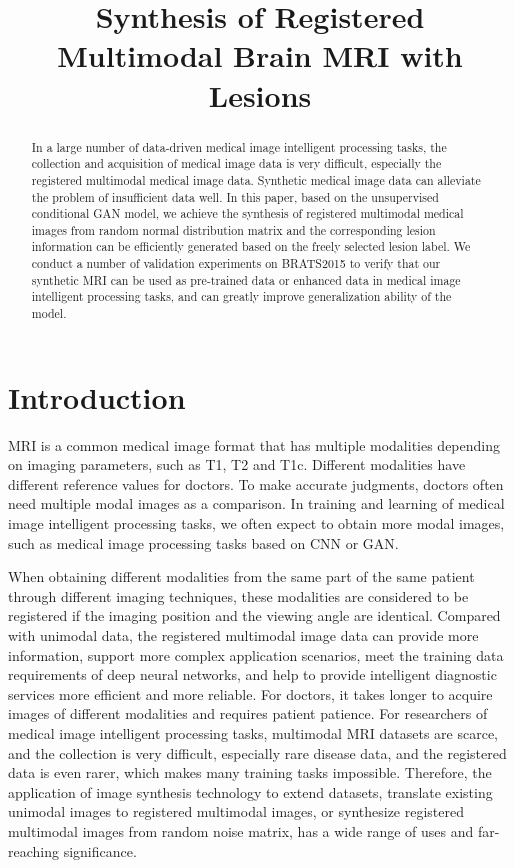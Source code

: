 \documentclass[letterpaper]{article} %
\title{Synthesis of Registered Multimodal Brain MRI with Lesions}
\begin{document}
\maketitle

\begin{abstract}
In a large number of data-driven medical image intelligent processing tasks, the collection and acquisition of medical image data is very difficult, especially the registered multimodal medical image data. Synthetic medical image data can alleviate the problem of insufficient data well. In this paper, based on the unsupervised conditional GAN model, we achieve the synthesis of registered multimodal medical images from random normal distribution matrix and the corresponding lesion information can be efficiently generated based on the freely selected lesion label. We conduct a number of validation experiments on BRATS2015 to verify that our synthetic MRI can be used as pre-trained data or enhanced data in medical image intelligent processing tasks, and can greatly improve generalization ability of the model.
\end{abstract}
	
\section{Introduction}
MRI is a common medical image format that has multiple modalities depending on imaging parameters, such as T1, T2 and T1c. Different modalities have different reference values for doctors. To make accurate judgments, doctors often need multiple modal images as a comparison. In training and learning of medical image intelligent processing tasks, we often expect to obtain more modal images, such as medical image processing tasks based on CNN\cite{86krizhevsky2012imagenet} or GAN\cite{25goodfellow2014generative}. 

When obtaining different modalities from the same part of the same patient through different imaging techniques, these modalities are considered to be registered if the imaging position and the viewing angle are identical. Compared with unimodal data, the registered multimodal image data can provide more information, support more complex application scenarios, meet the training data requirements of deep neural networks, and help to provide intelligent diagnostic services more efficient and more reliable. For doctors, it takes longer to acquire images of different modalities and requires patient patience. For researchers of medical image intelligent processing tasks, multimodal MRI datasets are scarce, and the collection is very difficult, especially rare disease data, and the registered data is even rarer, which makes many training tasks impossible. Therefore, the application of image synthesis technology to extend datasets, translate existing unimodal images to registered multimodal images, or synthesize registered multimodal images from random noise matrix, has a wide range of uses and far-reaching significance.
\end{document}
